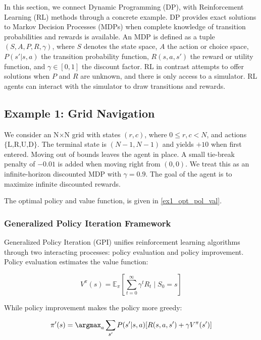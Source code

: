 In this section, we connect Dynamic Programming (DP), with Reinforcement Learning (RL) methods through a concrete example. DP provides exact solutions to Markov Decision Processes (MDPs) when complete knowledge of transition probabilities and rewards is available. An MDP is defined as a tuple $(S, A, P, R, \gamma)$, where $S$ denotes the state space, $A$ the action or choice space, $P(s'|s,a)$ the transition probability function, $R(s,a,s')$ the reward or utility function, and $\gamma \in [0,1]$ the discount factor. RL in contrast attempts to offer solutions when $P$ and $R$ are unknown, and there is only access to a simulator. RL agents can interact with the simulator to draw transitions and rewards.  

\subsection{Example 1: Grid Navigation}

We consider an N\(\times\)N grid with states \((r,c)\), where \(0 \le r,c < N\), and actions \(\{\text{L,R,U,D}\}\). The terminal state is \((N-1,N-1)\) and yields \(+10\) when first entered. Moving out of bounds leaves the agent in place. A small tie-break penalty of \(-0.01\) is added when moving right from \((0,0)\). We treat this as an infinite-horizon discounted MDP with \(\gamma = 0.9\). The goal of the agent is to maximize infinite discounted rewards. 

The optimal policy and value function, is given in \ref{ex1_opt_pol_val}. 

\subsubsection{Generalized Policy Iteration Framework}

Generalized Policy Iteration (GPI) unifies reinforcement learning algorithms through two interacting processes: policy evaluation and policy improvement. Policy evaluation estimates the value function:

\begin{equation}
    V^{\pi}(s) = \mathbb{E}_{\pi}\left[\sum_{t=0}^{\infty}\gamma^t R_t \mid S_0 = s\right]
\end{equation}

While policy improvement makes the policy more greedy:

\begin{equation}
    \pi'(s) = \argmax_a \sum_{s'} P(s'|s,a)[R(s,a,s') + \gamma V^{\pi}(s')]
\end{equation}


